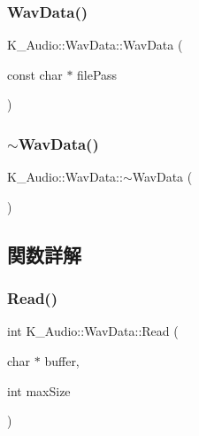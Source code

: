 \subsubsection{\texorpdfstring{Wav\+Data()}{WavData()}}
{\footnotesize\ttfamily K\+\_\+\+Audio\+::\+Wav\+Data\+::\+Wav\+Data (\begin{DoxyParamCaption}\item[{const char $\ast$}]{file\+Pass }\end{DoxyParamCaption})}

\mbox{\label{class_k___audio_1_1_wav_data_ad05439665a69a1cc318c79d869fa97e9}} 
\subsubsection{\texorpdfstring{$\sim$\+Wav\+Data()}{~WavData()}}
{\footnotesize\ttfamily K\+\_\+\+Audio\+::\+Wav\+Data\+::$\sim$\+Wav\+Data (\begin{DoxyParamCaption}{ }\end{DoxyParamCaption})}



\subsection{関数詳解}
\mbox{\label{class_k___audio_1_1_wav_data_a9b64967d83ac218c71949335d0583e69}} 
\subsubsection{\texorpdfstring{Read()}{Read()}}
{\footnotesize\ttfamily int K\+\_\+\+Audio\+::\+Wav\+Data\+::\+Read (\begin{DoxyParamCaption}\item[{char $\ast$}]{buffer,  }\item[{int}]{max\+Size }\end{DoxyParamCaption})\hspace{0.3cm}{\ttfamily [virtual]}}



